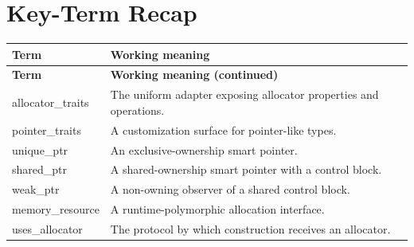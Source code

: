 \documentclass[11pt,letterpaper]{article}
\begin{document}
\section{Key-Term Recap}
\begin{longtable}{@{}>{\RaggedRight\arraybackslash}p{}>{\RaggedRight\arraybackslash}p{}@{}}\toprule\textbf{Term} & \textbf{Working meaning}\\\midrule\endfirsthead\toprule\textbf{Term} & \textbf{Working meaning (continued)}\\\midrule\endhead\bottomrule\endfoot
allocator\_\allowbreak{}traits & The uniform adapter exposing allocator properties and operations.\\
pointer\_\allowbreak{}traits & A customization surface for pointer-like types.\\
unique\_\allowbreak{}ptr & An exclusive-ownership smart pointer.\\
shared\_\allowbreak{}ptr & A shared-ownership smart pointer with a control block.\\
weak\_\allowbreak{}ptr & A non-owning observer of a shared control block.\\
memory\_\allowbreak{}resource & A runtime-polymorphic allocation interface.\\
uses\_\allowbreak{}allocator & The protocol by which construction receives an allocator.\\
\end{longtable}
\end{document}

